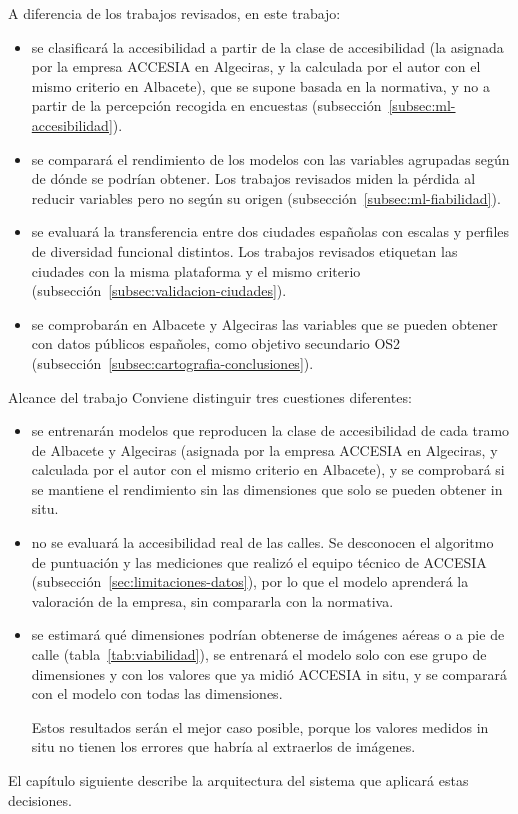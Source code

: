 A diferencia de los trabajos revisados, en este trabajo:
\begin{itemize}
  \item {} se clasificará la accesibilidad a partir de la clase de accesibilidad (la asignada por la empresa ACCESIA en Algeciras, y la calculada por el autor con el mismo criterio en Albacete), que se supone basada en la normativa, y no a partir de la percepción recogida en encuestas (subsección~\ref{subsec:ml-accesibilidad}).
  \item {} se comparará el rendimiento de los modelos con las variables agrupadas según de dónde se podrían obtener. Los trabajos revisados miden la pérdida al reducir variables pero no según su origen (subsección~\ref{subsec:ml-fiabilidad}).
  \item {} se evaluará la transferencia entre dos ciudades españolas con escalas y perfiles de diversidad funcional distintos. Los trabajos revisados etiquetan las ciudades con la misma plataforma y el mismo criterio (subsección~\ref{subsec:validacion-ciudades}).
  \item {} se comprobarán en Albacete y Algeciras las variables que se pueden obtener con datos públicos españoles, como objetivo secundario OS2 (subsección~\ref{subsec:cartografia-conclusiones}).
\end{itemize}

\begin{recuadro}[atencion]{Alcance del trabajo}
  Conviene distinguir tres cuestiones diferentes:
  \begin{itemize}
    \item {} se entrenarán modelos que reproducen la clase de accesibilidad de cada tramo de Albacete y Algeciras (asignada por la empresa ACCESIA en Algeciras, y calculada por el autor con el mismo criterio en Albacete), y se comprobará si se mantiene el rendimiento sin las dimensiones que solo se pueden obtener in situ.
    \item {} no se evaluará la accesibilidad real de las calles. Se desconocen el algoritmo de puntuación y las mediciones que realizó el equipo técnico de ACCESIA (subsección~\ref{sec:limitaciones-datos}), por lo que el modelo aprenderá la valoración de la empresa, sin compararla con la normativa.
    \item {} se estimará qué dimensiones podrían obtenerse de imágenes aéreas o a pie de calle (tabla~\ref{tab:viabilidad}), se entrenará el modelo solo con ese grupo de dimensiones y con los valores que ya midió ACCESIA in situ, y se comparará con el modelo con todas las dimensiones.\par
    Estos resultados serán el mejor caso posible, porque los valores medidos in situ no tienen los errores que habría al extraerlos de imágenes.
  \end{itemize}
\end{recuadro}

El capítulo siguiente describe la arquitectura del sistema que aplicará estas decisiones.
